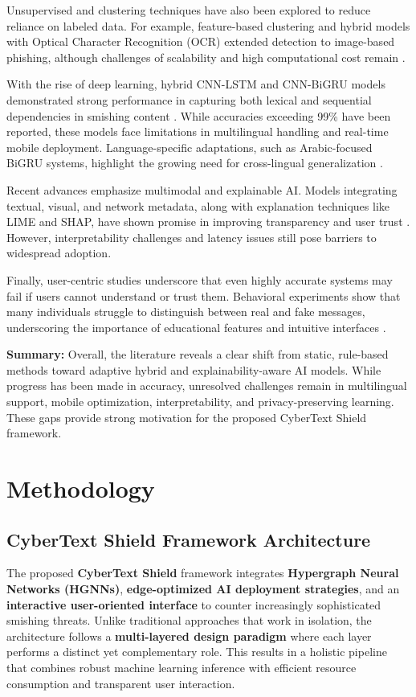 \documentclass[conference]{IEEEtran}
\begin{document}
Unsupervised and clustering techniques have also been explored to reduce reliance on labeled data. For example, feature-based clustering and hybrid models with Optical Character Recognition (OCR) extended detection to image-based phishing, although challenges of scalability and high computational cost remain \cite{ref6,ref10}.  

With the rise of deep learning, hybrid CNN-LSTM and CNN-BiGRU models demonstrated strong performance in capturing both lexical and sequential dependencies in smishing content \cite{ref7,ref11,ref12}. While accuracies exceeding 99\% have been reported, these models face limitations in multilingual handling and real-time mobile deployment. Language-specific adaptations, such as Arabic-focused BiGRU systems, highlight the growing need for cross-lingual generalization \cite{ref5}.  

Recent advances emphasize multimodal and explainable AI. Models integrating textual, visual, and network metadata, along with explanation techniques like LIME and SHAP, have shown promise in improving transparency and user trust \cite{ref3,ref4,ref2}. However, interpretability challenges and latency issues still pose barriers to widespread adoption.  

Finally, user-centric studies underscore that even highly accurate systems may fail if users cannot understand or trust them. Behavioral experiments show that many individuals struggle to distinguish between real and fake messages, underscoring the importance of educational features and intuitive interfaces \cite{ref13,ref9}.  

\textbf{Summary:} Overall, the literature reveals a clear shift from static, rule-based methods toward adaptive hybrid and explainability-aware AI models. While progress has been made in accuracy, unresolved challenges remain in multilingual support, mobile optimization, interpretability, and privacy-preserving learning. These gaps provide strong motivation for the proposed CyberText Shield framework.  



\section{Methodology}  
\IEEEoverridecommandlockouts  

\subsection{ CyberText Shield Framework Architecture}  
The proposed \textbf{CyberText Shield} framework integrates \textbf{Hypergraph Neural Networks (HGNNs)}, \textbf{edge-optimized AI deployment strategies}, and an \textbf{interactive user-oriented interface} to counter increasingly sophisticated smishing threats. Unlike traditional approaches that work in isolation, the architecture follows a \textbf{multi-layered design paradigm} where each layer performs a distinct yet complementary role. This results in a holistic pipeline that combines robust machine learning inference with efficient resource consumption and transparent user interaction.  
\end{document}
